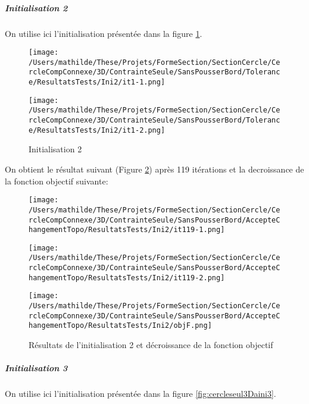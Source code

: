\documentclass[11pt,a4paper]{article}
\begin{document}
\subparagraph{Initialisation 2} On utilise ici l'initialisation présentée dans la figure \ref{fig:cercleseul3Daini2}.

\begin{figure}[H]
	\label{fig:cercleseul3Daini2}
	\begin{minipage}{0.45\textwidth}
		\centering
		\texttt{[image: /Users/mathilde/These/Projets/FormeSection/SectionCercle/CercleCompConnexe/3D/ContrainteSeule/SansPousserBord/Tolerance/ResultatsTests/Ini2/it1-1.png]}
	\end{minipage}
	\begin{minipage}{0.45\textwidth}
		\centering
		\texttt{[image: /Users/mathilde/These/Projets/FormeSection/SectionCercle/CercleCompConnexe/3D/ContrainteSeule/SansPousserBord/Tolerance/ResultatsTests/Ini2/it1-2.png]}
	\end{minipage}
	\caption{Initialisation 2}	
\end{figure}

On obtient le résultat suivant (Figure \ref{fig:cercleseul3Daini2Fin}) après 119 itérations et la decroissance de la fonction objectif suivante:

\begin{figure}[H]
	\label{fig:cercleseul3Daini2Fin}
	\begin{minipage}{0.33\textwidth}
		\centering
		\texttt{[image: /Users/mathilde/These/Projets/FormeSection/SectionCercle/CercleCompConnexe/3D/ContrainteSeule/SansPousserBord/AccepteChangementTopo/ResultatsTests/Ini2/it119-1.png]}
	\end{minipage}
	\begin{minipage}{0.33\textwidth}
		\centering
		\texttt{[image: /Users/mathilde/These/Projets/FormeSection/SectionCercle/CercleCompConnexe/3D/ContrainteSeule/SansPousserBord/AccepteChangementTopo/ResultatsTests/Ini2/it119-2.png]}
	\end{minipage}	
	\begin{minipage}{0.33\textwidth}
		\centering
		\texttt{[image: /Users/mathilde/These/Projets/FormeSection/SectionCercle/CercleCompConnexe/3D/ContrainteSeule/SansPousserBord/AccepteChangementTopo/ResultatsTests/Ini2/objF.png]}
	\end{minipage}	
	\caption{Résultats de l'initialisation 2 et décroissance de la fonction objectif}	
\end{figure}


\subparagraph{Initialisation 3} On utilise ici l'initialisation présentée dans la figure \ref{fig:cercleseul3Daini3}.
\end{document}
